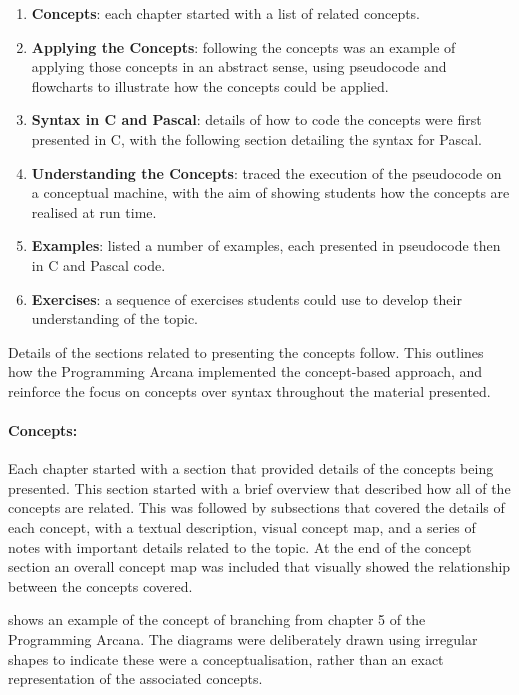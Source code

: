 \begin{enumerate}
  \item \textbf{Concepts}: each chapter started with a list of related concepts.
  \item \textbf{Applying the Concepts}: following the concepts was an example of applying those concepts in an abstract sense, using pseudocode and flowcharts to illustrate how the concepts could be applied.
  \item \textbf{Syntax in C and Pascal}: details of how to code the concepts were first presented in C, with the following section detailing the syntax for Pascal.
  \item \textbf{Understanding the Concepts}: traced the execution of the pseudocode on a conceptual machine, with the aim of showing students how the concepts are realised at run time. 
  \item \textbf{Examples}: listed a number of examples, each presented in pseudocode then in C and Pascal code.
  \item \textbf{Exercises}: a sequence of exercises students could use to develop their understanding of the topic.
\end{enumerate}

Details of the sections related to presenting the concepts follow. This outlines how the Programming Arcana implemented the concept-based approach, and reinforce the focus on concepts over syntax throughout the material presented. 

\clearpage
\paragraph{Concepts:} %
\label{par:concepts}

Each chapter started with a section that provided details of the concepts being presented. This section started with a brief overview that described how all of the concepts are related. This was followed by subsections that covered the details of each concept, with a textual description, visual concept map, and a series of notes with important details related to the topic. At the end of the concept section an overall concept map was included that visually showed the relationship between the concepts covered. 

 shows an example of the concept of branching from chapter 5 of the Programming Arcana. The diagrams were deliberately drawn using irregular shapes to indicate these were a conceptualisation, rather than an exact representation of the associated concepts.

